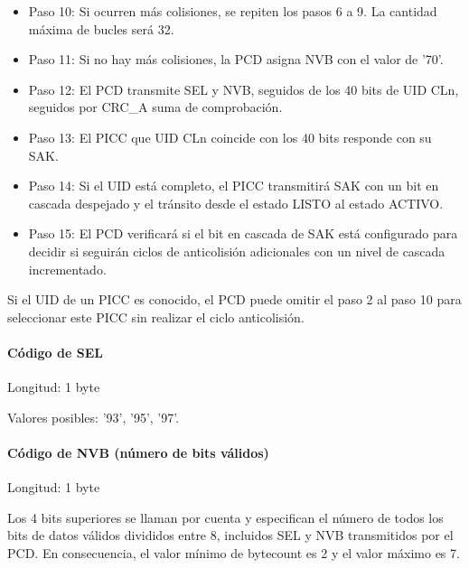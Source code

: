 \begin{itemize}
	\item Paso 10: Si ocurren más colisiones, se repiten los pasos 6 a 9. La cantidad máxima de bucles será 32.\par

	\item Paso 11: Si no hay más colisiones, la PCD asigna NVB con el valor de '70'.\par

	\item Paso 12: El PCD transmite SEL y NVB, seguidos de los 40 bits de UID CLn, seguidos por CRC\_A suma de comprobación.\par

	\item Paso 13: El PICC que UID CLn coincide con los 40 bits responde con su SAK.\par

	\item Paso 14: Si el UID está completo, el PICC transmitirá SAK con un bit en cascada despejado y el tránsito desde el estado LISTO al estado ACTIVO.\par

	\item Paso 15: El PCD verificará si el bit en cascada de SAK está configurado para decidir si seguirán ciclos de anticolisión adicionales con un nivel de cascada incrementado.
\end{itemize}\par

Si el UID de un PICC es conocido, el PCD puede omitir el paso 2 al paso 10 para seleccionar este PICC sin realizar el ciclo anticolisión.\par

\paragraph{Código de SEL}
Longitud: 1 byte\par

Valores posibles: '93', '95', '97'.\par

\paragraph{Código de NVB (número de bits válidos)}
Longitud: 1 byte\par

Los 4 bits superiores se llaman por cuenta y especifican el número de todos los bits de datos válidos divididos entre 8, incluidos SEL y NVB transmitidos por el PCD. En consecuencia, el valor mínimo de bytecount es 2 y el valor máximo es 7.\par

